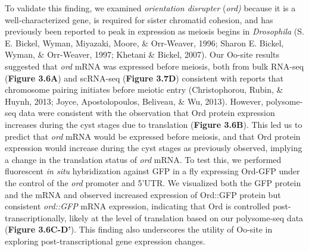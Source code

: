 \documentclass[12pt,oneside]{reedthesis}
\begin{document}

To validate this finding, we examined \emph{orientation disrupter} (\emph{ord)}
because it is a well-characterized gene, is required for sister
chromatid cohesion, and has previously been reported to peak in
expression as meiosis begins in \emph{Drosophila}
(S. E. Bickel, Wyman, Miyazaki, Moore, \& Orr-Weaver, 1996; Sharon E. Bickel, Wyman, \& Orr-Weaver, 1997; Khetani \& Bickel, 2007). Our Oo-site results suggested
that \emph{ord} mRNA was expressed before meiosis, both from bulk RNA-seq
(\textbf{Figure 3.6A}) and scRNA-seq (\textbf{Figure 3.7D}) consistent
with reports that chromosome pairing initiates before meiotic entry
(Christophorou, Rubin, \& Huynh, 2013; Joyce, Apostolopoulos, Beliveau, \& Wu, 2013). However, polysome-seq data were
consistent with the observation that Ord protein expression increases
during the cyst stages due to translation (\textbf{Figure 3.6B}). This led us
to predict that \emph{ord} mRNA would be expressed before meiosis, and that
Ord protein expression would increase during the cyst stages as
previously observed, implying a change in the translation status of
\emph{ord} mRNA. To test this, we performed fluorescent \emph{in situ}
hybridization against GFP in a fly expressing Ord-GFP under the control
of the \emph{ord} promoter and 5'UTR. We visualized both the GFP protein and
the mRNA and observed increased expression of Ord::GFP protein but
consistent \emph{ord::GFP} mRNA expression, indicating that Ord is controlled
post-transcriptionally, likely at the level of translation based on our
polysome-seq data (\textbf{Figure 3.6C-D'}). This finding also underscores the
utility of Oo-site in exploring post-transcriptional gene expression
changes.
\end{document}

